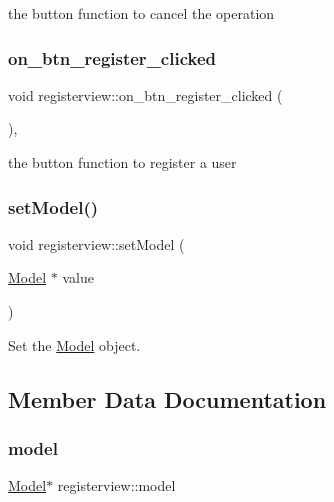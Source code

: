the button function to cancel the operation 

\mbox{\label{classregisterview_adafbe9fb4f180f8badc6dd9788bbcf15}} 
\subsubsection{\texorpdfstring{on\+\_\+btn\+\_\+register\+\_\+clicked}{on\_btn\_register\_clicked}}
{\footnotesize\ttfamily void registerview\+::on\+\_\+btn\+\_\+register\+\_\+clicked (\begin{DoxyParamCaption}{ }\end{DoxyParamCaption})\hspace{0.3cm}{\ttfamily [private]}, {\ttfamily [slot]}}



the button function to register a user 

\mbox{\label{classregisterview_ae6d6efee19c05f34f6e1c778f2a76ec7}} 
\subsubsection{\texorpdfstring{set\+Model()}{setModel()}}
{\footnotesize\ttfamily void registerview\+::set\+Model (\begin{DoxyParamCaption}\item[{\hyperlink{classModel}{Model} $\ast$}]{value }\end{DoxyParamCaption})}



Set the \hyperlink{classModel}{Model} object. 



\subsection{Member Data Documentation}
\mbox{\label{classregisterview_a1c8d39e08edad26afdfd16182189ee6c}} 
\subsubsection{\texorpdfstring{model}{model}}
{\footnotesize\ttfamily \hyperlink{classModel}{Model}$\ast$ registerview\+::model\hspace{0.3cm}{\ttfamily [private]}}

